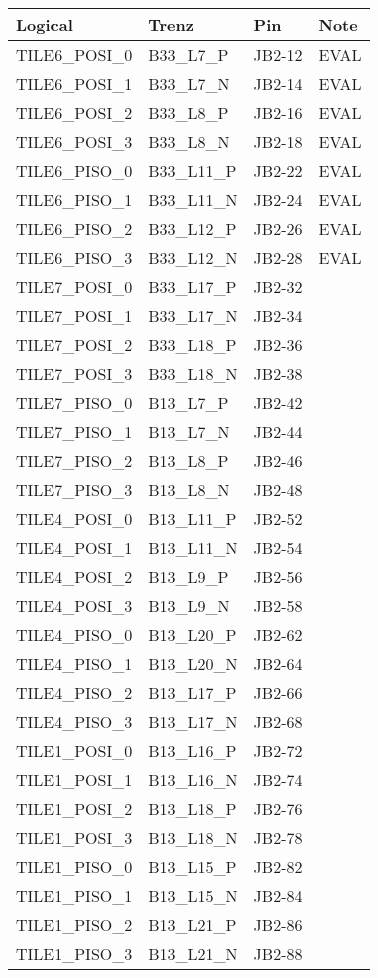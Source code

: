 \documentclass[12pt]{article}
\begin{document}
\begin{tabular}{llll}
\hline
Logical & Trenz & Pin & Note\\  
\hline
TILE6\_POSI\_0     & B33\_L7\_P   & JB2-12 & EVAL\\
TILE6\_POSI\_1     & B33\_L7\_N   & JB2-14 & EVAL\\
TILE6\_POSI\_2     & B33\_L8\_P   & JB2-16 & EVAL\\
TILE6\_POSI\_3     & B33\_L8\_N   & JB2-18 & EVAL\\
\hline
TILE6\_PISO\_0     & B33\_L11\_P  & JB2-22 & EVAL\\
TILE6\_PISO\_1     & B33\_L11\_N  & JB2-24 & EVAL\\
TILE6\_PISO\_2     & B33\_L12\_P  & JB2-26 & EVAL\\
TILE6\_PISO\_3     & B33\_L12\_N  & JB2-28 & EVAL\\
\hline
TILE7\_POSI\_0     & B33\_L17\_P  & JB2-32 & \\
TILE7\_POSI\_1     & B33\_L17\_N  & JB2-34 & \\
TILE7\_POSI\_2     & B33\_L18\_P  & JB2-36 & \\
TILE7\_POSI\_3     & B33\_L18\_N  & JB2-38 & \\
\hline
TILE7\_PISO\_0     & B13\_L7\_P   & JB2-42& \\
TILE7\_PISO\_1     & B13\_L7\_N   & JB2-44& \\
TILE7\_PISO\_2     & B13\_L8\_P   & JB2-46& \\
TILE7\_PISO\_3     & B13\_L8\_N   & JB2-48& \\
\hline
TILE4\_POSI\_0     & B13\_L11\_P  & JB2-52 & \\
TILE4\_POSI\_1     & B13\_L11\_N  & JB2-54 & \\
TILE4\_POSI\_2     & B13\_L9\_P   & JB2-56 & \\
TILE4\_POSI\_3     & B13\_L9\_N   & JB2-58 & \\
\hline
TILE4\_PISO\_0     & B13\_L20\_P  & JB2-62 & \\
TILE4\_PISO\_1     & B13\_L20\_N  & JB2-64 & \\
TILE4\_PISO\_2     & B13\_L17\_P  & JB2-66 & \\
TILE4\_PISO\_3     & B13\_L17\_N  & JB2-68 & \\
\hline
TILE1\_POSI\_0     & B13\_L16\_P  & JB2-72 & \\
TILE1\_POSI\_1     & B13\_L16\_N  & JB2-74 & \\
TILE1\_POSI\_2     & B13\_L18\_P  & JB2-76 & \\
TILE1\_POSI\_3     & B13\_L18\_N  & JB2-78 & \\
\hline
TILE1\_PISO\_0     & B13\_L15\_P  & JB2-82& \\
TILE1\_PISO\_1     & B13\_L15\_N  & JB2-84& \\
TILE1\_PISO\_2     & B13\_L21\_P  & JB2-86& \\
TILE1\_PISO\_3     & B13\_L21\_N  & JB2-88& \\
\hline
\end{tabular}
\end{document}
